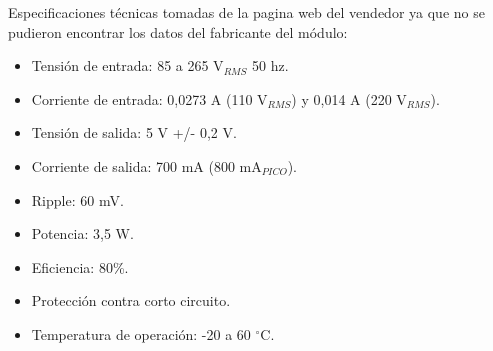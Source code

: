 Especificaciones técnicas tomadas de la pagina web del vendedor ya que no se pudieron encontrar los datos del fabricante del módulo:
\begin{itemize}
\item Tensión de entrada: 85 a 265 V$_{RMS}$ 50 hz.
\item Corriente de entrada: 0,0273 A (110 V$_{RMS}$) y 0,014 A (220 V$_{RMS}$).
\item Tensión de salida: 5 V +/- 0,2 V.
\item Corriente de salida: 700 mA (800 mA$_{PICO}$).
\item Ripple: 60 mV.
\item Potencia: 3,5 W.
\item Eficiencia: 80\%.
\item Protección contra corto circuito.
\item Temperatura de operación: -20 a 60 $^{\circ}$C.
\end{itemize}


